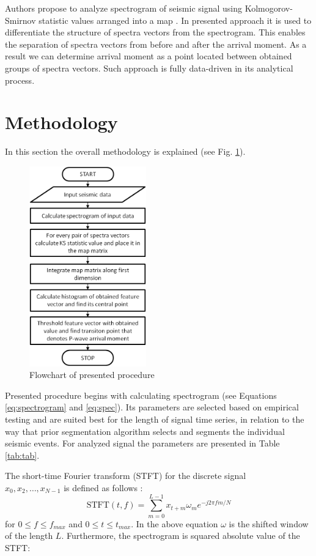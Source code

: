 \documentclass[smallextended]{svjour3}       %
\begin{document}
Authors propose to analyze spectrogram of seismic signal using Kolmogorov-Smirnov statistic values arranged into a map \cite{wodecki2017technical}. In presented approach it is used to differentiate the structure of spectra vectors from the spectrogram. This enables the separation of spectra vectors from before and after the arrival moment. As a result we can determine arrival moment as a point located between obtained groups of spectra vectors. Such approach is fully data-driven in its analytical process. 


\section{Methodology}

In this section the overall methodology is explained (see Fig. \ref{fig: block}).

\begin{figure}[!ht]
\centering
\includegraphics[width = 0.45\textwidth]{figs/block}
\caption{Flowchart of presented procedure}
\label{fig: block}
\end{figure}


Presented procedure begins with calculating spectrogram (see Equations \ref{eq:spectrogram} and \ref{eq:spec}). Its parameters are selected based on empirical testing and are suited best for the length of signal time series, in relation to the way that prior segmentation algorithm selects and segments the individual seismic events. For analyzed signal the parameters are presented in Table \ref{tab:tab}.

The short-time Fourier transform (STFT) for the discrete signal\\ $x_0, x_2, \dots , x_{N-1}$ is defined as follows \cite{oppenheim1999discrete}:
\begin{equation}
\label{eq:spectrogram}
\textrm{STFT}(t,f)=\sum_{m=0}^{L-1} x_{t+m}\omega_{m}e^{-j2\pi fm/N}
\end{equation}
for $0\leq f\leq f_{max}$ and $0\leq t\leq t_{max}$. In the above equation $\omega$ is the shifted window of the length $L$. Furthermore, the spectrogram is squared absolute value of the STFT:
\end{document}
